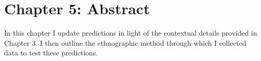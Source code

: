 \chapter*{Chapter 5: Abstract}




In this chapter I update predictions in light of the contextual details provided in Chapter 3.  I then outline the ethnographic method through which I collected data to test these predictions.
